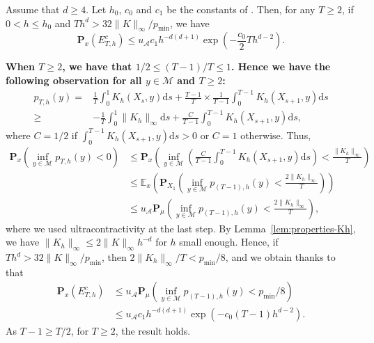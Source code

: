 \documentclass[10pt,a4paper]{amsart}
\renewenvironment{proof}[1]{\par\medskip\noindent\textbf{#1}\enspace\ignorespaces}{\par\medskip}
\newcommand\cA{\mathcal{A}}
\newcommand\cM{\mathcal{M}}
\newcommand\dd{\mathrm{d}}
\newcommand{\E}{{\mathbb E}}
\newcommand{\PAR}[1]{{{\left(#1\right)}}} %
\renewcommand{\P}{{\mathbf P}}
\begin{document}
	\begin{lemma}\label{prop:proba-any-distribution}
 Assume that $d\ge 4$. Let $h_0$, $c_0$ and $c_1$ be  the constants of  . Then, for any $T\ge 2$, if $0<h\le h_0$ and $Th^d>32\|K\|_\infty/p_{\min}$, we have
	\[ \P_{x}\PAR{ E_{T,h}^c }  \le u_\cA c_1h^{-d(d+1)}\exp\PAR{- \frac{c_0}{2}Th^{d-2}}.\]
\end{lemma} 

\begin{proof}{When $T\ge 2$, we have that $1/2\le (T-1)/T\le 1$.
Hence we have the following observation for all $y \in \cM$ and $T\ge 2$:}
\begin{align*}
	p_{T,h}(y)= & \frac{1}{T}\int_0^1 K_h(X_s,y)\dd s +\frac{T-1}{T} \times \frac{1}{T-1}  \int_0^{T-1}  K_h(X_{s+1},y)\dd s \\
	\ge &  - \frac{1}{T} \int_0^1 \| K_h\|_{\infty} \dd s + \frac{{C}}{T-1}  \int_0^{T-1}  K_h(X_{s+1},y)\dd s,
\end{align*}{where $C=1/2$ if $\int_0^{T-1}  K_h(X_{s+1},y)\dd s>0$ or $C=1$ otherwise. }Thus,
	\begin{align*}
		\P_{x}\PAR{ \inf_{ y\in\cM}p_{T,h}(y) <0 } & \le  \P_{x} \PAR{   \inf_{y \in \cM } \PAR{ \frac{{C}}{T-1}  \int_0^{T-1} K_h(X_{s+1},y)\dd s } <\frac{\|K_h\|_{\infty}}{T }}  \\
		 &\le \E_{x} \PAR{\P_{X_1}\PAR{ \inf_{ y\in\cM}p_{(T-1),h}(y) < \frac{2\|K_h\|_{\infty}}{ T }}}\\
&\le u_\cA \P_{\mu}\PAR{ \inf_{ y\in\cM}p_{(T-1),h}(y) < \frac{2\|K_h\|_{\infty}}{  T }},
	\end{align*}
where we used  ultracontractivity at the last step. By Lemma~\ref{lem:properties-Kh}, we have $\|K_h\|_{\infty}\le 2\|K\|_\infty h^{-d}$ for $h$ small enough. Hence, if $Th^d>32\|K\|_\infty/  p_{\min}$, then $2\|K_h\|_{\infty}/T <p_{\min}/8$, and we obtain thanks to  that
\begin{align*}
    \P_{x}\PAR{E_{T,h}^c}&\le u_\cA \P_{\mu}\PAR{ \inf_{ y\in\cM}p_{(T-1),h}(y) < p_{\min}/8}\\
&\le u_\cA c_{1}h^{-d(d+1)}\exp(-c_0(T-1)h^{d-2}).
\end{align*}
As $T-1\ge T/2$, for $T\ge 2$, the result holds.
\end{proof}
\end{document}
